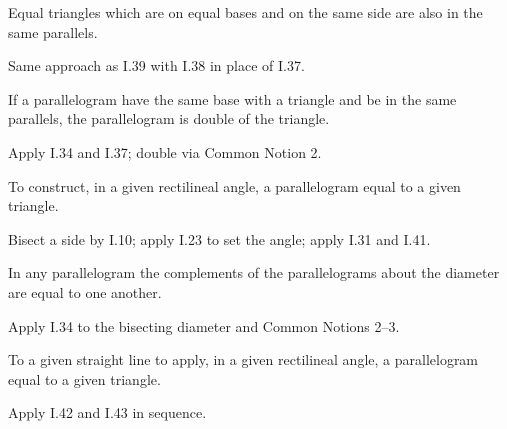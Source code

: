 \documentclass{rrxiv}
\begin{document}
\begin{claim}
\label{prop:I.40}
Equal triangles which are on equal bases and on the same side are
also in the same parallels.
\end{claim}
\begin{evidence}[Proof of I.40]
\label{ev:I.40}
Same approach as I.39 with I.38 in place of I.37.
\end{evidence}

\begin{claim}
\label{prop:I.41}
If a parallelogram have the same base with a triangle and be in the
same parallels, the parallelogram is double of the triangle.
\end{claim}
\begin{evidence}[Proof of I.41]
\label{ev:I.41}
Apply I.34 and I.37; double via Common Notion 2.
\end{evidence}

\begin{claim}
\label{prop:I.42}
To construct, in a given rectilineal angle, a parallelogram equal to
a given triangle.
\end{claim}
\begin{evidence}[Proof of I.42]
\label{ev:I.42}
Bisect a side by I.10; apply I.23 to set the angle; apply I.31 and
I.41.
\end{evidence}

\begin{claim}
\label{prop:I.43}
In any parallelogram the complements of the parallelograms about the
diameter are equal to one another.
\end{claim}
\begin{evidence}[Proof of I.43]
\label{ev:I.43}
Apply I.34 to the bisecting diameter and Common Notions 2--3.
\end{evidence}

\begin{claim}
\label{prop:I.44}
To a given straight line to apply, in a given rectilineal angle, a
parallelogram equal to a given triangle.
\end{claim}
\begin{evidence}[Proof of I.44]
\label{ev:I.44}
Apply I.42 and I.43 in sequence.
\end{evidence}
\end{document}
